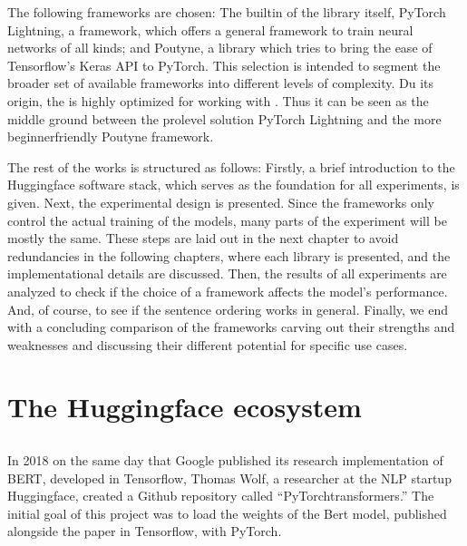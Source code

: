 \documentclass[letterpaper,10pt,english]{jupyterBook}
\begin{document}
\sphinxAtStartPar
The following frameworks are chosen: The built\sphinxhyphen{}in  of the  library itself, PyTorch Lightning, a framework, which offers a general framework to train neural networks of all kinds; and Poutyne, a library which tries to bring the ease of Tensorflow’s Keras API to PyTorch.
This selection is intended to segment the broader set of available frameworks into different levels of complexity. Du its origin, the  is highly optimized for working with . Thus it can be seen as the middle ground between the pro\sphinxhyphen{}level solution PyTorch Lightning and the more beginner\sphinxhyphen{}friendly Poutyne framework.

\sphinxAtStartPar
The rest of the works is structured as follows:
Firstly, a brief introduction to the Huggingface software stack, which serves as the foundation for all experiments, is given.
Next, the experimental design is presented. Since the frameworks only control the actual training of the models, many parts of the experiment will be mostly the same.
These steps are laid out in the next chapter to avoid redundancies in the following chapters, where each library is presented, and the implementational details are discussed.
Then, the results of all experiments are analyzed to check if the choice of a framework affects the model’s performance. And, of course, to see if the sentence ordering works in general.
Finally, we end with a concluding comparison of the frameworks carving out their strengths and weaknesses and discussing their different potential for specific use cases.


\chapter{The Huggingface ecosystem}
\label{\detokenize{HuggingfaceEcosystem:the-huggingface-ecosystem}}\label{\detokenize{HuggingfaceEcosystem::doc}}

\section{}
\label{\detokenize{HuggingfaceEcosystem:tranformers}}
\sphinxAtStartPar
In 2018 on the same day that Google published its research implementation of BERT, developed in Tensorflow, Thomas Wolf, a researcher at the NLP startup Huggingface, created a Github repository called “PyTorch\sphinxhyphen{}transformers.”
The initial goal of this project was to load the weights of the Bert model, published alongside the paper in Tensorflow, with PyTorch.
\end{document}
